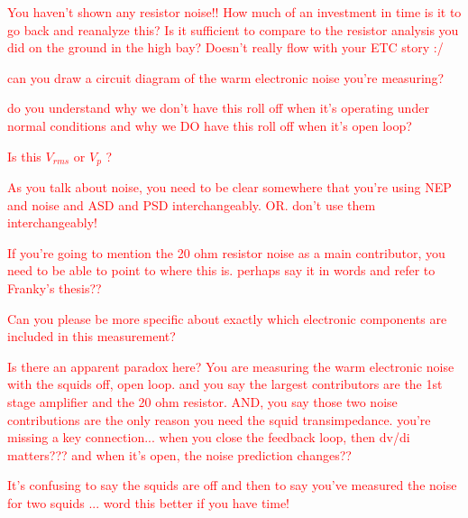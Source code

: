 \textcolor{red}{You haven't shown any resistor noise!! How much of an investment in time is it to go back and reanalyze this? Is it sufficient to compare to the resistor analysis you did on the ground in the high bay? Doesn't really flow with your ETC story :/}

\textcolor{red}{can you draw a circuit diagram of the warm electronic noise you're measuring?}


\textcolor{red}{do you understand why we don't have this roll off when it's operating under normal conditions and why we DO have this roll off when it's open loop?}

\textcolor{red}{Is this $V_{rms}$ or $V_{p}$ ?}

\textcolor{red}{As you talk about noise, you need to be clear somewhere that you're using NEP and noise and ASD and PSD interchangeably. OR. don't use them interchangeably!}


\textcolor{red}{If you're going to mention the 20 ohm resistor noise as a main contributor, you need to be able to point to where this is. perhaps say it in words and refer to Franky's thesis??}


\textcolor{red}{Can you please be more specific about exactly which electronic components are included in this measurement?}

\textcolor{red}{Is there an apparent paradox here? You are measuring the warm electronic noise with the squids off, open loop. and you say the largest contributors are the 1st stage amplifier and the 20 ohm resistor. AND, you say those two noise contributions are the only reason you need the squid transimpedance. you're missing a key connection... when you close the feedback loop, then dv/di matters??? and when it's open, the noise prediction changes??}

\textcolor{red}{It's confusing to say the squids are off and then to say you've measured the noise for two squids ... word this better if you have time!}

